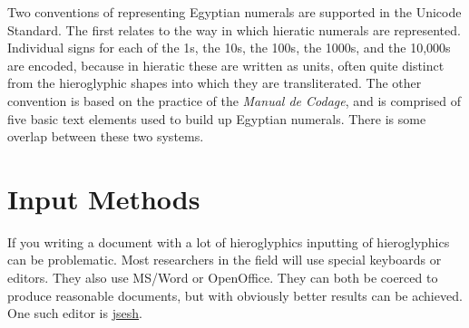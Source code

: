 Two conventions of representing Egyptian numerals are supported in the Unicode Standard.
The first relates to the way in which hieratic numerals are represented. Individual
signs for each of the 1s, the 10s, the 100s, the 1000s, and the 10,000s are encoded, because in
hieratic these are written as units, often quite distinct from the hieroglyphic shapes into
which they are transliterated. The other convention is based on the practice of the \emph{Manual
de Codage}, and is comprised of five basic text elements used to build up Egyptian numerals.
There is some overlap between these two systems.

%

\section{Input Methods}

If you writing a document with a lot of hieroglyphics inputting of hieroglyphics can be problematic. Most researchers in the field will use special keyboards or editors. They also use MS/Word or OpenOffice. They can both be coerced to produce reasonable documents, but with \tex obviously better results can be achieved. One such editor is \href{http://jsesh.qenherkhopeshef.org/}{jsesh}. 


